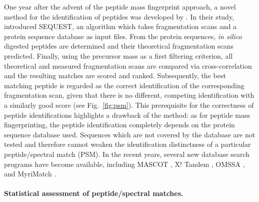 One year after the advent of the peptide mass fingerprint approach, a novel
method for the identification of peptides was developed by \citet{Eng1994}.
In their study, \citeauthor{Eng1994} introduced SEQUEST, an algorithm which
takes fragmentation scans and a protein sequence database as input files.
From the protein sequences, {\em in silico} digested peptides are determined
and their theoretical fragmentation scans predicted.
Finally, using the precursor mass as a first filtering criterion, all
theoretical and measured fragmentation scans are compared via cross-correlation
and the resulting matches are scored and ranked.
Subsequently, the best matching peptide is regarded as the correct 
identification of the corresponding fragmentation scan, given that there is
no different, competing identification with a similarly good score (see 
Fig.~\ref{fig:psm}).
This prerequisite for the correctness of peptide identifications highlights
a drawback of the method: as for peptide mass fingerprinting, the peptide
identification completely depends on the protein sequence database used.
Sequences which are not covered by the database are not tested and therefore
cannot weaken the identification distinctness of a particular peptide/spectral 
match (PSM).
In the recent years, several new database search programs have become 
available, including MASCOT \citep{Perkins1999}, X! Tandem \citep{Craig2004},
OMSSA \citep{Geer2004}, and MyriMatch \citep{Tabb2007}.

\paragraph{Statistical assessment of peptide/spectral matches.} 

